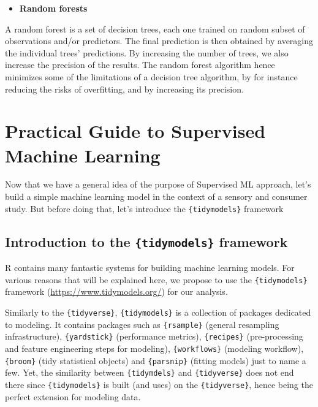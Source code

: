 \documentclass[
]{krantz}
\providecommand{\tightlist}{%
  \setlength{\itemsep}{0pt}\setlength{\parskip}{0pt}}
\begin{document}
\begin{itemize}
\tightlist
\item
  \textbf{Random forests}
\end{itemize}

A random forest is a set of decision trees, each one trained on random subset of observations and/or predictors. The final prediction is then obtained by averaging the individual trees' predictions. By increasing the number of trees, we also increase the precision of the results. The random forest algorithm hence minimizes some of the limitations of a decision tree algorithm, by for instance reducing the risks of overfitting, and by increasing its precision.

\hypertarget{practical-guide-to-supervised-machine-learning}{%
\section{Practical Guide to Supervised Machine Learning}\label{practical-guide-to-supervised-machine-learning}}

Now that we have a general idea of the purpose of Supervised ML approach, let's build a simple machine learning model in the context of a sensory and consumer study. But before doing that, let's introduce the \texttt{\{tidymodels\}} framework

\hypertarget{introduction-to-the-tidymodels-framework}{%
\subsection{\texorpdfstring{Introduction to the \texttt{\{tidymodels\}} framework}{Introduction to the \{tidymodels\} framework}}\label{introduction-to-the-tidymodels-framework}}

R contains many fantastic systems for building machine learning models. For various reasons that will be explained here, we propose to use the \texttt{\{tidymodels\}} framework (\url{https://www.tidymodels.org/}) for our analysis.

Similarly to the \texttt{\{tidyverse\}}, \texttt{\{tidymodels\}} is a collection of packages dedicated to modeling. It contains packages such as \texttt{\{rsample\}} (general resampling infrastructure), \texttt{\{yardstick\}} (performance metrics), \texttt{\{recipes\}} (pre-processing and feature engineering steps for modeling), \texttt{\{workflows\}} (modeling workflow), \texttt{\{broom\}} (tidy statistical objects) and \texttt{\{parsnip\}} (fitting models) just to name a few. Yet, the similarity between \texttt{\{tidymdels\}} and \texttt{\{tidyverse\}} does not end there since \texttt{\{tidymodels\}} is built (and uses) on the \texttt{\{tidyverse\}}, hence being the perfect extension for modeling data.
\end{document}
